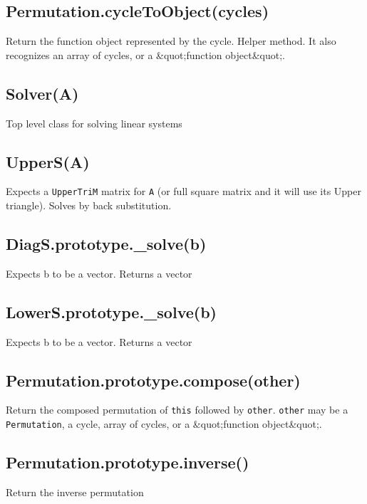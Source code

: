 \documentclass{article}
\begin{document}
    \subsection*{Permutation.cycleToObject(cycles)}
    Return the function object represented by the cycle. Helper method.
It also recognizes an array of cycles, or a \&quot;function object\&quot;.


    \subsection*{Solver(A)}
    Top level class for solving linear systems


    \subsection*{UpperS(A)}
    Expects a \texttt{UpperTriM} matrix for \texttt{A} (or full square matrix and it will use its Upper triangle).
Solves by back substitution.


    \subsection*{DiagS.prototype.\_solve(b)}
    Expects b to be a vector. Returns a vector


    \subsection*{LowerS.prototype.\_solve(b)}
    Expects b to be a vector. Returns a vector


    \subsection*{Permutation.prototype.compose(other)}
    Return the composed permutation of \texttt{this} followed by \texttt{other}.
\texttt{other} may be a \texttt{Permutation}, a cycle, array of cycles, or a \&quot;function object\&quot;.


    \subsection*{Permutation.prototype.inverse()}
    Return the inverse permutation
\end{document}
